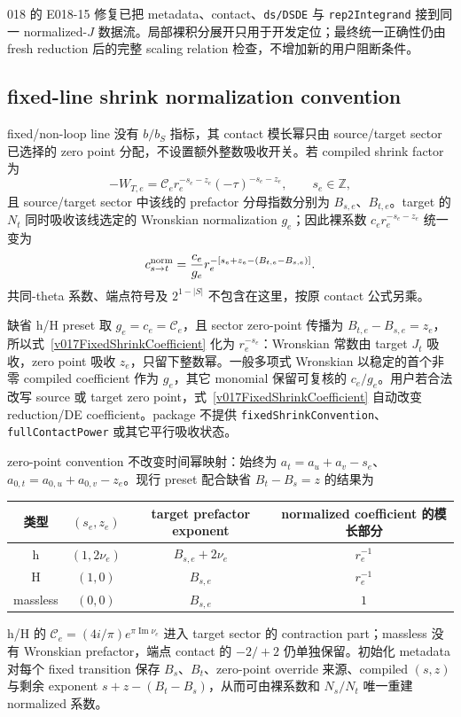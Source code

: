 ﻿\documentclass[a4paper,11pt]{article}
\begin{document}
018 的 E018-15 修复已把 metadata、contact、\texttt{ds/DSDE} 与 \texttt{rep2Integrand} 接到同一 normalized-$J$ 数据流。局部裸积分展开只用于开发定位；最终统一正确性仍由 fresh reduction 后的完整 scaling relation 检查，不增加新的用户阻断条件。

\subsection{fixed-line shrink normalization convention}

fixed/non-loop line 没有 $b/b_S$ 指标，其 contact 模长幂只由 source/target sector 已选择的 zero point 分配，不设置额外整数吸收开关。若 compiled shrink factor 为
\begin{equation}
 -W_{T,e}=\mathcal C_e r_e^{-s_e-z_e}(-\tau)^{-s_e-z_e},
 \qquad s_e\in\mathbb Z,
\end{equation}
且 source/target sector 中该线的 prefactor 分母指数分别为 $B_{s,e}$、$B_{t,e}$。target 的 $N_t$ 同时吸收该线选定的 Wronskian normalization $g_e$；因此裸系数 $c_e r_e^{-s_e-z_e}$ 统一变为
\begin{equation}
 c^{\rm norm}_{s\to t}
 ={c_e\over g_e}r_e^{-\left[s_e+z_e-(B_{t,e}-B_{s,e})\right]}.
 \label{v017FixedShrinkCoefficient}
\end{equation}
共同-theta 系数、端点符号及 $2^{1-|S|}$ 不包含在这里，按原 contact 公式另乘。

缺省 h/H preset 取 $g_e=c_e=\mathcal C_e$，且 sector zero-point 传播为 $B_{t,e}-B_{s,e}=z_e$，所以式~\eqref{v017FixedShrinkCoefficient} 化为 $r_e^{-s_e}$：Wronskian 常数由 target $J_t$ 吸收，zero point 吸收 $z_e$，只留下整数幂。一般多项式 Wronskian 以稳定的首个非零 compiled coefficient 作为 $g_e$，其它 monomial 保留可复核的 $c_e/g_e$。用户若合法改写 source 或 target zero point，式~\eqref{v017FixedShrinkCoefficient} 自动改变 reduction/DE coefficient。package 不提供 \texttt{fixedShrinkConvention}、\texttt{fullContactPower} 或其它平行吸收状态。

zero-point convention 不改变时间幂映射：始终为 $a_t=a_u+a_v-s_e$、$a_{0,t}=a_{0,u}+a_{0,v}-z_e$。现行 preset 配合缺省 $B_t-B_s=z$ 的结果为
\begin{center}
\small
\begin{tabular}{c|c|c|c}
 类型 & $(s_e,z_e)$ & target prefactor exponent & normalized coefficient 的模长部分\\ \hline
 h & $(1,2\nu_e)$ & $B_{s,e}+2\nu_e$ & $r_e^{-1}$\\
 H & $(1,0)$ & $B_{s,e}$ & $r_e^{-1}$\\
 massless & $(0,0)$ & $B_{s,e}$ & $1$
\end{tabular}
\end{center}
h/H 的 $\mathcal C_e=(4i/\pi)e^{\pi\operatorname{Im}\nu_e}$ 进入 target sector 的 contraction part；massless 没有 Wronskian prefactor，端点 contact 的 $-2/+2$ 仍单独保留。初始化 metadata 对每个 fixed transition 保存 $B_s$、$B_t$、zero-point override 来源、compiled $(s,z)$ 与剩余 exponent $s+z-(B_t-B_s)$，从而可由裸系数和 $N_s/N_t$ 唯一重建 normalized 系数。
\end{document}
